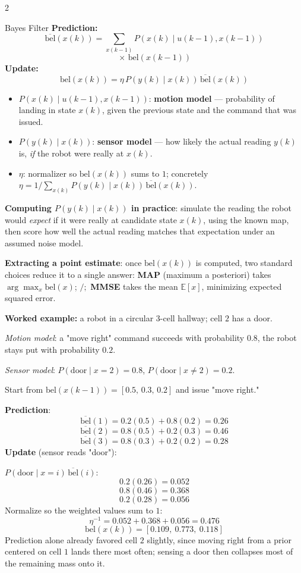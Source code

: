 \documentclass[10pt,a4paper]{article}
\newcommand{\keyterm}[1]{\textbf{#1}}
\begin{document}
\begin{multicols}{2}
\begin{defbox}{Bayes Filter}
\textbf{Prediction:}
\[
\overline{\mathrm{bel}}(x(k))=\sum_{x(k-1)} P(x(k)\mid u(k{-}1),x(k{-}1))
\]
\[
{}\times\,\mathrm{bel}(x(k-1))
\]
\textbf{Update:}
\[
\mathrm{bel}(x(k))=\eta\, P(y(k)\mid x(k))\,\overline{\mathrm{bel}}(x(k))
\]
\end{defbox}
\begin{itemize}
\item $P(x(k)\mid u(k{-}1),x(k{-}1))$: \keyterm{motion model} --- probability of landing in state $x(k)$, given the previous state and the command that was issued.
\item $P(y(k)\mid x(k))$: \keyterm{sensor model} --- how likely the actual reading $y(k)$ is, \emph{if} the robot were really at $x(k)$.
\item $\eta$: normalizer so $\mathrm{bel}(x(k))$ sums to $1$; concretely $\eta=1\big/\sum_{x(k)}P(y(k)\mid x(k))\,\overline{\mathrm{bel}}(x(k))$.
\end{itemize}
\begin{notebox}
\keyterm{Computing $P(y(k)\mid x(k))$ in practice}: simulate the reading the robot would \emph{expect} if it were really at candidate state $x(k)$, using the known map, then score how well the actual reading matches that expectation under an assumed noise model.

\keyterm{Extracting a point estimate}: once $\mathrm{bel}(x(k))$ is computed, two standard choices reduce it to a single answer: \keyterm{MAP} (maximum a posteriori) takes $\arg\max_{x}\mathrm{bel}(x)$; $/;$ \keyterm{MMSE} takes the mean $\mathbb E[x]$, minimizing expected squared error.
\end{notebox}

\keyterm{Worked example:} a robot in a circular 3-cell hallway; cell $2$ has a door. 

\textit{Motion model}: a "move right" command succeeds with probability $0.8$, the robot stays put with probability $0.2$. 

\textit{Sensor model}: $P(\text{door}\mid x{=}2)=0.8$, $P(\text{door}\mid x{\ne}2)=0.2$.

Start from $\mathrm{bel}(x(k{-}1))=[0.5,\,0.3,\,0.2]$ and issue "move right."

\textbf{Prediction}:
\[
\overline{\mathrm{bel}}(1)=0.2(0.5)+0.8(0.2)=0.26
\]
\[
\overline{\mathrm{bel}}(2)=0.8(0.5)+0.2(0.3)=0.46
\]
\[
\overline{\mathrm{bel}}(3)=0.8(0.3)+0.2(0.2)=0.28
\]
\textbf{Update} (sensor reads "door"): 

$P(\text{door}\mid x{=}i)\,\overline{\mathrm{bel}}(i)$:
\[
0.2(0.26)=0.052
\]
\[
0.8(0.46)=0.368
\]
\[
0.2(0.28)=0.056
\]
Normalize so the weighted values sum to $1$:
\[
\eta^{-1}=0.052+0.368+0.056=0.476
\]
\[
\mathrm{bel}(x(k))= [0.109,\ 0.773,\ 0.118]
\]
Prediction alone already favored cell $2$ slightly, since moving right from a prior centered on cell $1$ lands there most often; sensing a door then collapses most of the remaining mass onto it.


\end{multicols}
\end{document}
